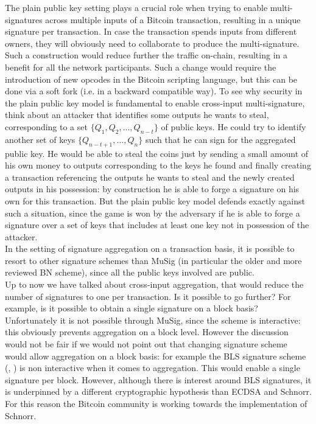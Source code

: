 \bigskip
\noindent
The plain public key setting plays a crucial role when trying to enable multi-signatures across multiple inputs of a Bitcoin transaction, resulting in a unique signature per transaction.  In case the transaction spends inputs from different owners, they will obviously need to collaborate to produce the multi-signature. Such a construction would reduce further the traffic on-chain, resulting in a benefit for all the network participants. Such a change would require the introduction of new opcodes in the Bitcoin scripting language, but this can be done via a soft fork (i.e. in a backward compatible way). To see why security in the plain public key model is fundamental to enable cross-input multi-signature, think about an attacker that identifies some outputs he wants to steal, corresponding to a set $\{Q_1, Q_2, ..., Q_{n - t}\}$ of public keys. He could try to identify another set of keys $\{Q_{n - t + 1}, ..., Q_n\}$ such that he can sign for the aggregated public key. He would be able to steal the coins just by sending a small amount of his own money to outputs corresponding to the keys he found and finally creating a transaction referencing the outputs he wants to steal and the newly created outputs in his possession: by construction he is able to forge a signature on his own for this transaction. But the plain public key model defends exactly against such a situation, since the game is won by the adversary if he is able to forge a signature over a set of keys that includes at least one key not in possession of the attacker. 
\\
In the setting of signature aggregation on a transaction basis, it is possible to resort to other signature schemes than MuSig (in particular the older and more reviewed BN scheme), since all the public keys involved are public.
\\
Up to now we have talked about cross-input aggregation, that would reduce the number of signatures to one per transaction. Is it possible to go further? For example, is it possible to obtain a single signature on a block basis? Unfortunately it is not possible through MuSig, since the scheme is interactive: this obviously prevents aggregation on a block level. However the discussion would not be fair if we would not point out that changing signature scheme would allow aggregation on a block basis: for example the BLS signature scheme (\cite{RefWork:15}, \cite{RefWork:16}) is non interactive when it comes to aggregation. This would enable a single signature per block. However, although there is interest around BLS signatures, it is underpinned by a different cryptographic hypothesis than ECDSA and Schnorr. For this reason the Bitcoin community is working towards the implementation of Schnorr.

